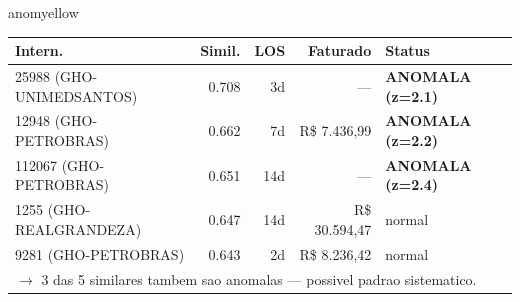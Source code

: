 \documentclass[a4paper,10pt]{article}
\begin{document}
\begin{anomalycard}[Internacao 204 | GHO-COPEL | MODERADO (z=2.11)]{anomyellow}
\begin{tabular}{l r r r l}\toprule\textbf{Intern.} & \textbf{Simil.} & \textbf{LOS} & \textbf{Faturado} & \textbf{Status} \\\midrule
25988 (GHO-UNIMEDSANTOS) & 0.708 & 3d & --- & \textcolor{anomred}{\textbf{ANOMALA (z=2.1)}} \\
12948 (GHO-PETROBRAS) & 0.662 & 7d & R\$ 7.436,99 & \textcolor{anomred}{\textbf{ANOMALA (z=2.2)}} \\
112067 (GHO-PETROBRAS) & 0.651 & 14d & --- & \textcolor{anomred}{\textbf{ANOMALA (z=2.4)}} \\
1255 (GHO-REALGRANDEZA) & 0.647 & 14d & R\$ 30.594,47 & \textcolor{jcubeblue}{normal} \\
9281 (GHO-PETROBRAS) & 0.643 & 2d & R\$ 8.236,42 & \textcolor{jcubeblue}{normal} \\
\multicolumn{5}{l}{\textcolor{anomred}{\small $\rightarrow$ 3 das 5 similares tambem sao anomalas --- possivel padrao sistematico.}} \\
\bottomrule\end{tabular}



\end{anomalycard}
\end{document}
